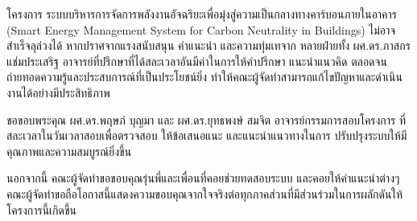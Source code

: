 %

\begin{acknowledgments}
\sloppy
\hspace{\parindent}โครงการ ระบบบริหารการจัดการพลังงานอัจฉริยะเพื่อมุ่งสู่ความเป็นกลางทางคาร์บอนภายในอาคาร (Smart Energy Management System for Carbon Neutrality in Buildings) ไม่อาจสําเร็จลุล่วงได้ หากปราศจากแรงสนับสนุน คําแนะนํา และความทุ่มเทจาก
หลายฝ่ายทั้ง ผศ.ดร.ภาสกร แช่มประเสริฐ อาจารย์ที่ปรึกษาที่ได้สละเวลาอันมีค่าในการให้คำปรึกษา แนะนำแนวคิด ตลอดจนถ่ายทอดความรู้และประสบการณ์ที่เป็นประโยชน์ยิ่ง ทำให้คณะผู้จัดทำสามารถแก้ไขปัญหาและดำเนินงานได้อย่างมีประสิทธิภาพ

ขอขอบพระคุณ ผศ.ดร.พฤษภ์ บุญมา และ ผศ.ดร.ยุทธพงษ์ สมจิต 
อาจารย์กรรมการสอบโครงการ ที่สละเวลาในวันเวลาสอบเพื่อตรวจสอบ ให้ข้อเสนอแนะ และแนะนําแนวทางในการ
ปรับปรุงระบบให้มีคุณภาพและความสมบูรณ์ยิ่งขึ้น

นอกจากนี้ คณะผู้จัดทำขอขอบคุณรุ่นพี่และเพื่อนที่คอยช่วยทดสอบระบบ และคอยให้คําแนะนําต่างๆ
คณะผู้จัดทำขอถือโอกาสนี้แสดงความขอบคุณจากใจจริงต่อทุกภาคส่วนที่มีส่วนร่วมในการผลักดันให้โครงการนี้เกิดขึ้น

\end{acknowledgments}%
\fi %

\contentspage

\ifproject
\figurelistpage

\tablelistpage
\fi %



